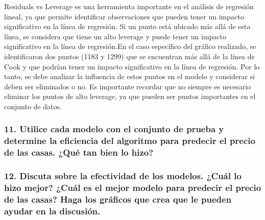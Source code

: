 \documentclass[
]{article}
\newenvironment{Shaded}{\begin{snugshade}}{\end{snugshade}}
\newcommand{\AttributeTok}[1]{\textcolor[rgb]{0.77,0.63,0.00}{#1}}
\newcommand{\FunctionTok}[1]{\textcolor[rgb]{0.00,0.00,0.00}{#1}}
\newcommand{\NormalTok}[1]{#1}
\newcommand{\SpecialCharTok}[1]{\textcolor[rgb]{0.00,0.00,0.00}{#1}}
\newcommand{\StringTok}[1]{\textcolor[rgb]{0.31,0.60,0.02}{#1}}
\begin{document}
Residuals vs Leverage es una herramienta importante en el análisis de
regresión lineal, ya que permite identificar observaciones que pueden
tener un impacto significativo en la línea de regresión. Si un punto
está ubicado más allá de esta línea, se considera que tiene un alto
leverage y puede tener un impacto significativo en la línea de
regresión.En el caso específico del gráfico realizado, se identificaron
dos puntos (1183 y 1299) que se encuentran más allá de la línea de Cook
y que podrían tener un impacto significativo en la línea de regresión.
Por lo tanto, se debe analizar la influencia de estos puntos en el
modelo y considerar si deben ser eliminados o no. Es importante recordar
que no siempre es necesario eliminar los puntos de alto leverage, ya que
pueden ser puntos importantes en el conjunto de datos.

\hypertarget{utilice-cada-modelo-con-el-conjunto-de-prueba-y-determine-la-eficiencia-del-algoritmo-para-predecir-el-precio-de-las-casas.-quuxe9-tan-bien-lo-hizo}{%
\subsubsection{11. Utilice cada modelo con el conjunto de prueba y
determine la eficiencia del algoritmo para predecir el precio de las
casas. ¿Qué tan bien lo
hizo?}\label{utilice-cada-modelo-con-el-conjunto-de-prueba-y-determine-la-eficiencia-del-algoritmo-para-predecir-el-precio-de-las-casas.-quuxe9-tan-bien-lo-hizo}}

\hypertarget{discuta-sobre-la-efectividad-de-los-modelos.-cuuxe1l-lo-hizo-mejor-cuuxe1l-es-el-mejor-modelo-para-predecir-el-precio-de-las-casas-haga-los-gruxe1ficos-que-crea-que-le-pueden-ayudar-en-la-discusiuxf3n.}{%
\subsubsection{12. Discuta sobre la efectividad de los modelos. ¿Cuál lo
hizo mejor? ¿Cuál es el mejor modelo para predecir el precio de las
casas? Haga los gráficos que crea que le pueden ayudar en la
discusión.}\label{discuta-sobre-la-efectividad-de-los-modelos.-cuuxe1l-lo-hizo-mejor-cuuxe1l-es-el-mejor-modelo-para-predecir-el-precio-de-las-casas-haga-los-gruxe1ficos-que-crea-que-le-pueden-ayudar-en-la-discusiuxf3n.}}

\begin{Shaded}
\end{Shaded}
\end{document}
